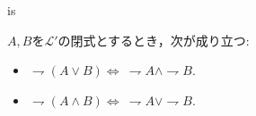 	is
	
	\begin{screen}
		\begin{metathm}[De Morganの法則]
			$A,B$を$\mathcal{L}'$の閉式とするとき，次が成り立つ:
			\begin{itemize}
				\item $\rightharpoondown (A \vee B) \Longleftrightarrow\ \rightharpoondown A \wedge \rightharpoondown B$.
			
				\item $\rightharpoondown (A \wedge B) \Longleftrightarrow\ \rightharpoondown A \vee \rightharpoondown B$.
			\end{itemize}
		\end{metathm}
	\end{screen}
	
